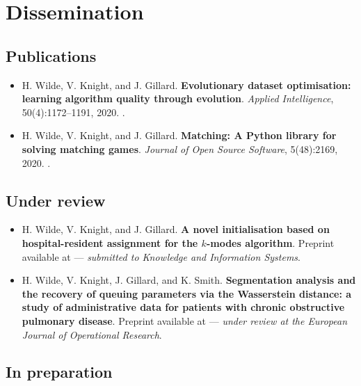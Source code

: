 \chapter*{Dissemination}

\section*{Publications}

\begin{itemize}
    \item \cite{Wilde2020:edo} H. Wilde, V. Knight, and J. Gillard.
        \textbf{Evolutionary dataset optimisation: learning algorithm quality
        through evolution}.  \emph{Applied Intelligence}, 50(4):1172–1191,
        2020. .
    \item \cite{Wilde2020:matching} H. Wilde, V. Knight, and J. Gillard.
        \textbf{Matching: A Python library for solving matching games}.
        \emph{Journal of Open Source Software}, 5(48):2169,
        2020. .
\end{itemize}

\section*{Under review}

\begin{itemize}
    \item \cite{Wilde2020:kmodes} H. Wilde, V. Knight, and J. Gillard. \textbf{A
        novel initialisation based on hospital-resident assignment for the
        \(k\)-modes algorithm}. Preprint available at  ---
        \emph{submitted to Knowledge and Information Systems}.
    \item \cite{Wilde2020:copd} H. Wilde, V. Knight, J. Gillard, and K. Smith.
        \textbf{Segmentation analysis and the recovery of queuing parameters via
        the Wasserstein distance: a study of administrative data for patients
        with chronic obstructive pulmonary disease}. Preprint available at
         ---
        \emph{under review at the European Journal of Operational Research}.
\end{itemize}

\section*{In preparation}

